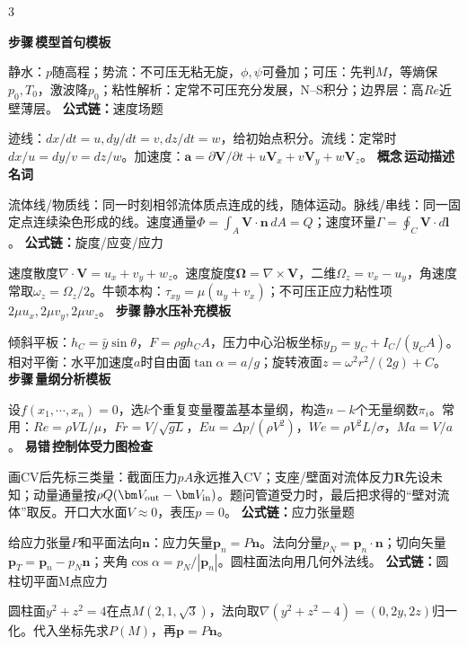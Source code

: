\documentclass[a4paper]{article}
\newcommand{\form}[1]{{\color{M}\bfseries 公式链：}#1\par}
\newcommand{\labtag}[3]{{\bfseries\color{#1}\colorbox{#1}{\color{white}\fontsize{2.18}{2.28}\selectfont #2}\,#3}\par}
\newcommand{\step}[1]{\labtag{S}{步骤}{#1}}
\newcommand{\err}[1]{\labtag{R}{易错}{#1}}
\newcommand{\concept}[1]{\labtag{V}{概念}{#1}}
\newcommand{\stepq}[1]{\step{#1}}
\newcommand{\formq}[1]{\form{#1}}
\newcommand{\errq}[1]{\err{#1}}
\newcommand{\conceptq}[1]{\concept{#1}}
\newenvironment{vfourWrap}{\par\begingroup\fontsize{2.66}{2.80}\selectfont\setlength{\fboxsep}{0.38pt}}{\par\endgroup}
\begin{document}
\begin{multicols}{3}
\begin{vfourWrap}
\stepq{模型首句模板}
静水：$p$随高程；势流：不可压无粘无旋，$\phi,\psi$可叠加；可压：先判$M$，等熵保$p_0,T_0$，激波降$p_0$；粘性解析：定常不可压充分发展，N--S积分；边界层：高$Re$近壁薄层。
\formq{速度场题}
迹线：$dx/dt=u,dy/dt=v,dz/dt=w$，给初始点积分。流线：定常时$dx/u=dy/v=dz/w$。加速度：$\bm a=\partial\bm V/\partial t+u\bm V_x+v\bm V_y+w\bm V_z$。
\conceptq{运动描述名词}
流体线/物质线：同一时刻相邻流体质点连成的线，随体运动。脉线/串线：同一固定点连续染色形成的线。速度通量$\Phi=\int_A\bm V\cdot\bm n\,dA=Q$；速度环量$\Gamma=\oint_C\bm V\cdot d\bm l$。
\formq{旋度/应变/应力}
速度散度$\nabla\cdot\bm V=u_x+v_y+w_z$。速度旋度$\bm\Omega=\nabla\times\bm V$，二维$\Omega_z=v_x-u_y$，角速度常取$\omega_z=\Omega_z/2$。牛顿本构：$\tau_{xy}=\mu(u_y+v_x)$；不可压正应力粘性项$2\mu u_x,2\mu v_y,2\mu w_z$。
\stepq{静水压补充模板}
倾斜平板：$h_C=\bar y\sin\theta$，$F=\rho gh_CA$，压力中心沿板坐标$y_D=y_C+I_C/(y_CA)$。相对平衡：水平加速度$a$时自由面$\tan\alpha=a/g$；旋转液面$z=\omega^2r^2/(2g)+C$。
\stepq{量纲分析模板}
设$f(x_1,\cdots,x_n)=0$，选$k$个重复变量覆盖基本量纲，构造$n-k$个无量纲数$\pi_i$。常用：$Re=\rho VL/\mu$，$Fr=V/\sqrt{gL}$，$Eu=\Delta p/(\rho V^2)$，$We=\rho V^2L/\sigma$，$Ma=V/a$。
\errq{控制体受力图检查}
画CV后先标三类量：截面压力$pA$永远推入CV；支座/壁面对流体反力$\bm R$先设未知；动量通量按$\rho Q(\bm V_{\rm out}-\bm V_{\rm in})$。题问管道受力时，最后把求得的“壁对流体”取反。开口大水面$V\approx0$，表压$p=0$。
\formq{应力张量题}
给应力张量$P$和平面法向$\bm n$：应力矢量$\bm p_n=P\bm n$。法向分量$p_N=\bm p_n\cdot\bm n$；切向矢量$\bm p_T=\bm p_n-p_N\bm n$；夹角$\cos\alpha=p_N/|\bm p_n|$。圆柱面法向用几何外法线。
\formq{圆柱切平面M点应力}
圆柱面$y^2+z^2=4$在点$M(2,1,\sqrt3)$，法向取$\nabla(y^2+z^2-4)=(0,2y,2z)$归一化。代入坐标先求$P(M)$，再$\bm p=P\bm n$。


\end{vfourWrap}
\end{multicols}
\end{document}
